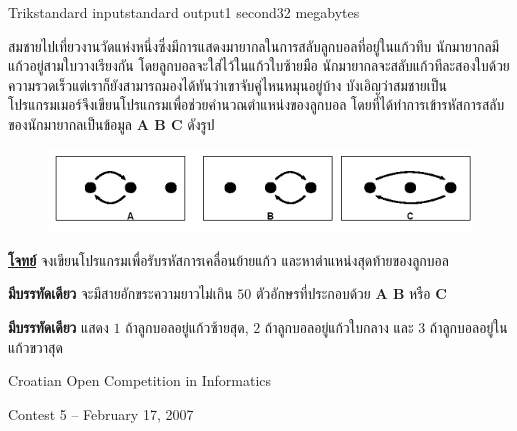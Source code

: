 \documentclass[11pt,a4paper]{article}
\begin{document}
\begin{problem}{Trik}{standard input}{standard output}{1 second}{32 megabytes}

สมชายไปเที่ยวงานวัดแห่งหนึ่งซึ่งมีการแสดงมายากลในการสลับลูกบอลที่อยู่ในแก้วทึบ นักมายากลมีแก้วอยู่สามใบวางเรียงกัน โดยลูกบอลจะใส่ไว้ในแก้วใบซ้ายมือ นักมายากลจะสลับแก้วทีละสองใบด้วยความรวดเร็วแต่เราก็ยังสามารถมองได้ทันว่าเขาจับคู่ไหนหมุนอยู่บ้าง บังเอิญว่าสมชายเป็นโปรแกรมเมอร์จึงเขียนโปรแกรมเพื่อช่วยคำนวณตำแหน่งของลูกบอล โดยที่ได้ทำการเข้ารหัสการสลับของนักมายากลเป็นข้อมูล \textbf{A B C} ดังรูป

\begin{figure}[h]
\centering
\includegraphics[width=1\textwidth]{../latex/img/0010/0010-1.png}
\end{figure}

\underline{\textbf{โจทย์}} จงเขียนโปรแกรมเพื่อรับรหัสการเคลื่อนย้ายแก้ว และหาตำแหน่งสุดท้ายของลูกบอล

\InputFile

\textbf{มีบรรทัดเดียว} จะมีสายอักขระความยาวไม่เกิน $50$ ตัวอักษรที่ประกอบด้วย \textbf{A B} หรือ \textbf{C}


\OutputFile

\textbf{มีบรรทัดเดียว} แสดง $1$ ถ้าลูกบอลอยู่แก้วซ้ายสุด, $2$ ถ้าลูกบอลอยู่แก้วใบกลาง และ $3$ ถ้าลูกบอลอยู่ในแก้วขวาสุด

\Examples

\begin{example}
%
%
\end{example}

\newpage
\Source

Croatian Open Competition in Informatics

Contest 5 – February 17, 2007

\end{problem}
\end{document}
